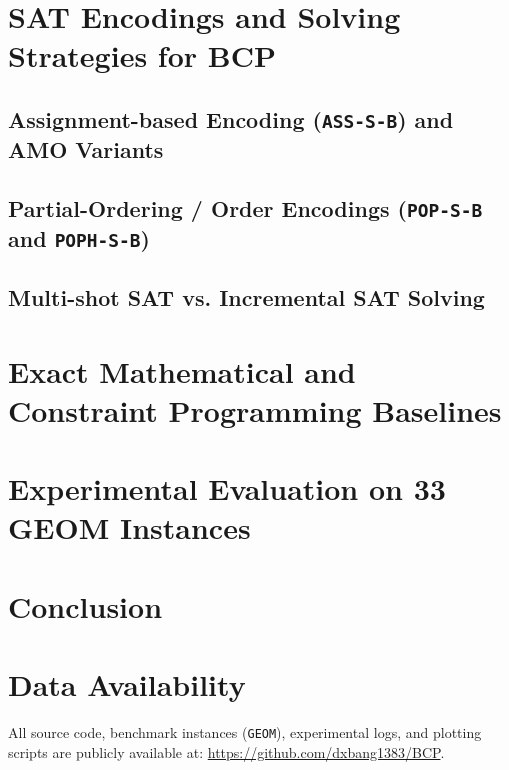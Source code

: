 \documentclass[a4paper,fleqn]{cas-sc}
\begin{document}
\section{SAT Encodings and Solving Strategies for BCP}
\subsection{Assignment-based Encoding (\texttt{ASS-S-B}) and AMO Variants}

\subsection{Partial-Ordering / Order Encodings (\texttt{POP-S-B} and \texttt{POPH-S-B})}

\subsection{Multi-shot SAT vs. Incremental SAT Solving}

\section{Exact Mathematical and Constraint Programming Baselines}

\section{Experimental Evaluation on 33 GEOM Instances}

\section{Conclusion}

\section*{Data Availability}
All source code, benchmark instances (\texttt{GEOM}), experimental logs, and plotting scripts are publicly available at: \url{https://github.com/dxbang1383/BCP}.



\end{document}
